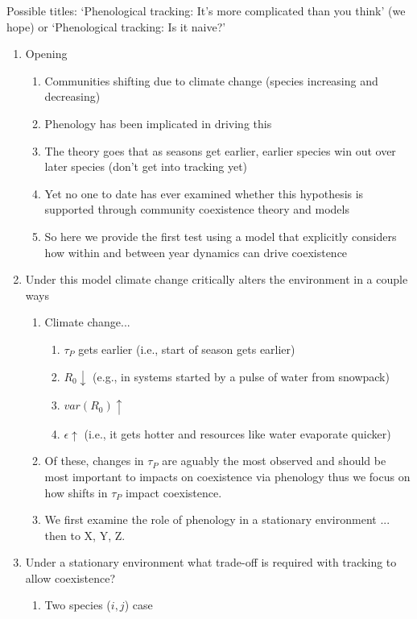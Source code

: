 \documentclass[11pt,a4paper,oneside]{article}
\begin{document}
\noindent Possible titles: `Phenological tracking: It's more complicated than you think' (we hope) or `Phenological tracking: Is it naive?'
\begin{enumerate}
\item Opening
\begin{enumerate}
\item Communities shifting due to climate change (species increasing and decreasing)
\item Phenology has been implicated in driving this 
\item The theory goes that as seasons get earlier, earlier species win out over later species (don't get into tracking yet)
\item Yet no one to date has ever examined whether this hypothesis is supported through community coexistence theory and models
\item So here we provide the first test using a model that explicitly considers how within and between year dynamics can drive coexistence
\end{enumerate}
\item Under this model climate change critically alters the environment in a couple ways
\begin{enumerate}
\item Climate change...
\begin{enumerate}
\item $\tau_{P}$ gets earlier (i.e., start of season gets earlier)
\item $R_{0} \downarrow$ (e.g., in systems started by a pulse of water from snowpack)
\item $var(R_{0}) \uparrow$ 
\item $\epsilon \uparrow$ (i.e., it gets hotter and resources like water evaporate quicker)
\end{enumerate}
\item Of these, changes in $\tau_{P}$ are aguably the most observed and should be most important to impacts on coexistence via phenology thus we focus on how shifts in $\tau_{P}$ impact coexistence.
\item We first examine the role of phenology in a stationary environment ... then to X, Y, Z.
\end{enumerate}
\item Under a stationary environment what trade-off is required with tracking to allow coexistence?
\begin{enumerate}
\item Two species ($i, j$) case
\begin{enumerate}

\end{enumerate}
\end{enumerate}
\end{enumerate}
\end{document}
